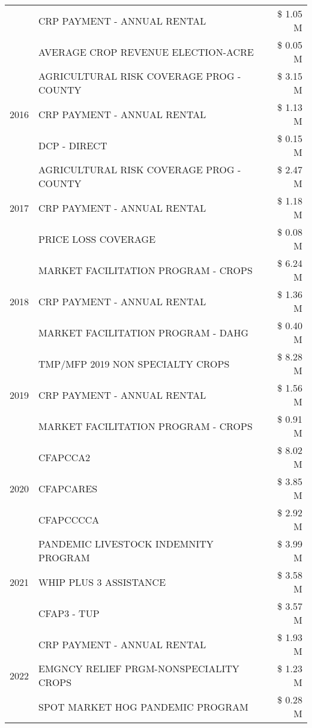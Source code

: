 \begin{tabular}{llr}
 & CRP PAYMENT - ANNUAL RENTAL & \$ 1.05 M \\
 & AVERAGE CROP REVENUE ELECTION-ACRE & \$ 0.05 M \\
\cline{1-3}
\multirow[t]{3}{*}{2016} & AGRICULTURAL RISK COVERAGE PROG - COUNTY & \$ 3.15 M \\
 & CRP PAYMENT - ANNUAL RENTAL & \$ 1.13 M \\
 & DCP - DIRECT & \$ 0.15 M \\
\cline{1-3}
\multirow[t]{3}{*}{2017} & AGRICULTURAL RISK COVERAGE PROG - COUNTY & \$ 2.47 M \\
 & CRP PAYMENT - ANNUAL RENTAL & \$ 1.18 M \\
 & PRICE LOSS COVERAGE & \$ 0.08 M \\
\cline{1-3}
\multirow[t]{3}{*}{2018} & MARKET FACILITATION PROGRAM - CROPS & \$ 6.24 M \\
 & CRP PAYMENT - ANNUAL RENTAL & \$ 1.36 M \\
 & MARKET FACILITATION PROGRAM - DAHG & \$ 0.40 M \\
\cline{1-3}
\multirow[t]{3}{*}{2019} & TMP/MFP 2019 NON SPECIALTY CROPS & \$ 8.28 M \\
 & CRP PAYMENT - ANNUAL RENTAL & \$ 1.56 M \\
 & MARKET FACILITATION PROGRAM - CROPS & \$ 0.91 M \\
\cline{1-3}
\multirow[t]{3}{*}{2020} & CFAPCCA2 & \$ 8.02 M \\
 & CFAPCARES & \$ 3.85 M \\
 & CFAPCCCCA & \$ 2.92 M \\
\cline{1-3}
\multirow[t]{3}{*}{2021} & PANDEMIC LIVESTOCK INDEMNITY PROGRAM & \$ 3.99 M \\
 & WHIP PLUS 3 ASSISTANCE & \$ 3.58 M \\
 & CFAP3 - TUP & \$ 3.57 M \\
\cline{1-3}
\multirow[t]{3}{*}{2022} & CRP PAYMENT - ANNUAL RENTAL & \$ 1.93 M \\
 & EMGNCY RELIEF PRGM-NONSPECIALITY CROPS & \$ 1.23 M \\
 & SPOT MARKET HOG PANDEMIC PROGRAM & \$ 0.28 M \\
\cline{1-3}
\bottomrule
\end{tabular}
